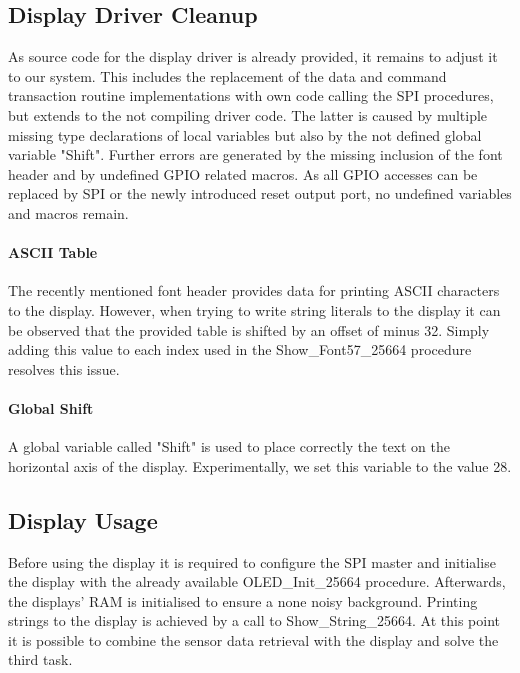 		\subsection{Display Driver Cleanup} %
		\label{sub:impl_display_driver_cleanup}
			As source code for the display driver is already provided, it remains to adjust it to our system. This includes the replacement of the data and command transaction routine implementations with own code calling the SPI procedures, but extends to the not compiling driver code. The latter is caused by multiple missing type declarations of local variables but also by the not defined global variable "Shift". Further errors are generated by the missing inclusion of the font header and by undefined GPIO related macros. As all GPIO accesses can be replaced by SPI or the newly introduced reset output port, no undefined variables and macros remain.

			\paragraph{ASCII Table} %
			\label{par:ascii_table}
				The recently mentioned font header provides data for printing ASCII characters to the display. However, when trying to write string literals to the display it can be observed that the provided table is shifted by an offset of minus \num{32}. Simply adding this value to each index used in the Show\_Font57\_25664 procedure resolves this issue.

			\paragraph{Global Shift} %
			\label{par:global_shift}
				A global variable called "Shift" is used to place correctly the text on the horizontal axis of the display. Experimentally, we set this variable to the value \num{28}. 

		\subsection{Display Usage} %
		\label{sub:display_usage}
			Before using the display it is required to configure the SPI master and initialise the display with the already available OLED\_Init\_25664 procedure. Afterwards, the displays' RAM is initialised to ensure a none noisy background.
			Printing strings to the display is achieved by a call to Show\_String\_25664. At this point it is possible to combine the sensor data retrieval with the display and solve the third task.

